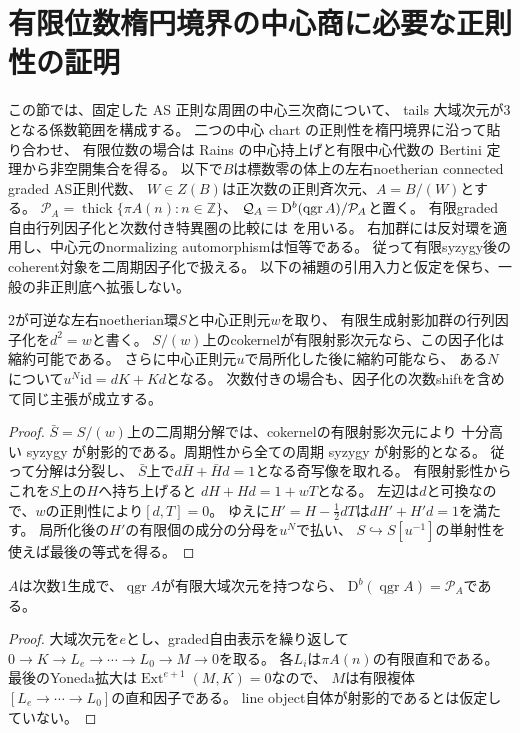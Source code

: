 \section{有限位数楕円境界の中心商に必要な正則性の証明}
\label{CSBGsec:pair-finite-order-background}
この節では、固定した AS 正則な周囲の中心三次商について、
tails 大域次元が3となる係数範囲を構成する。
二つの中心 chart の正則性を楕円境界に沿って貼り合わせ、
有限位数の場合は Rains の中心持上げと有限中心代数の Bertini 定理から非空開集合を得る。
以下で$B$は標数零の体上の左右noetherian connected graded AS正則代数、
$W\in Z(B)$は正次数の正則斉次元、$A=B/(W)$とする。
$\mathcal P_A=\operatorname{thick}\{\pi A(n):n\in\mathbb Z\}$、
$\mathcal Q_A=\mathrm D^b(\operatorname{qgr} A)/\mathcal P_A$と置く。
有限graded自由行列因子化と次数付き特異圏の比較には
\cite[arXiv v1, Theorems~4.7, 5.5]{CSBGCCKM}を用いる。
右加群には反対環を適用し、中心元のnormalizing automorphismは恒等である。
従って有限syzygy後のcoherent対象を二周期因子化で扱える。
以下の補題の引用入力と仮定を保ち、一般の非正則底へ拡張しない。
\begin{lemma}[有限射影因子化の縮約と分母払い]
\label{CSBGlem:gluing-contraction}
$2$が可逆な左右noetherian環$S$と中心正則元$w$を取り、
有限生成射影加群の行列因子化を$d^2=w$と書く。
$S/(w)$上のcokernelが有限射影次元なら、この因子化は縮約可能である。
さらに中心正則元$u$で局所化した後に縮約可能なら、
ある$N$について$u^N\mathrm{id}=dK+Kd$となる。
次数付きの場合も、因子化の次数shiftを含めて同じ主張が成立する。
\end{lemma}
\begin{proof}
$\bar S=S/(w)$上の二周期分解では、cokernelの有限射影次元により
十分高い syzygy が射影的である。周期性から全ての周期 syzygy が射影的となる。
従って分解は分裂し、
$\bar S$上で$d\bar H+\bar Hd=1$となる奇写像を取れる。
有限射影性からこれを$S$上の$H$へ持ち上げると
$dH+Hd=1+wT$となる。
左辺は$d$と可換なので、$w$の正則性により$[d,T]=0$。
ゆえに$H'=H-\frac12dT$は$dH'+H'd=1$を満たす。
局所化後の$H'$の有限個の成分の分母を$u^N$で払い、
$S\hookrightarrow S[u^{-1}]$の単射性を使えば最後の等式を得る。
\end{proof}

\begin{lemma}[有限大域次元からtwistsによる生成へ]
\label{CSBGlem:global-finite-to-perfect}
$A$は次数1生成で、$\operatorname{qgr}A$が有限大域次元を持つなら、
$\mathrm D^b(\operatorname{qgr}A)=\mathcal P_A$である。
\end{lemma}
\begin{proof}
大域次元を$e$とし、graded自由表示を繰り返して
$0\to K\to L_e\to\cdots\to L_0\to M\to0$を取る。
各$L_i$は$\pi A(n)$の有限直和である。
最後のYoneda拡大は$\operatorname{Ext}^{e+1}(M,K)=0$なので、
$M$は有限複体$[L_e\to\cdots\to L_0]$の直和因子である。
line object自体が射影的であるとは仮定していない。
\end{proof}


